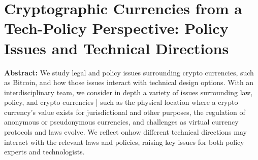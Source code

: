 \section{Cryptographic Currencies from a Tech-Policy Perspective: Policy Issues and Technical Directions }

\textbf{Abstract:} 
We study legal and policy issues surrounding crypto currencies, such as Bitcoin, and how those issues interact with technical design options. With an interdisciplinary team, we consider in depth a variety of  issues  surrounding  law,  policy,  and  crypto  currencies | such  as  the physical location where a crypto currency's value exists for jurisdictional and other purposes, the regulation of anonymous or pseudonymous currencies, and challenges as virtual currency protocols and laws evolve. We reflect  onhow  different  technical  directions  may  interact  with  the  relevant  laws  and  policies,  raising  key  issues  for  both  policy  experts  and technologists.
